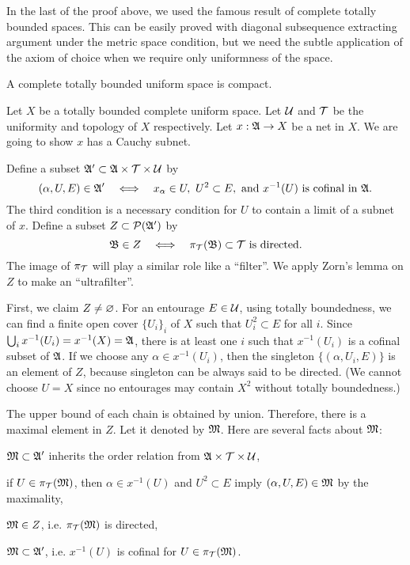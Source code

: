 \documentclass{../exp}
\begin{document}
In the last of the proof above, we used the famous result of complete totally bounded spaces.
This can be easily proved with diagonal subsequence extracting argument under the metric space condition, but we need the subtle application of the axiom of choice when we require only uniformness of the space.

\begin{thm}
A complete totally bounded uniform space is compact.
\end{thm}
\begin{pf}[1]
Let $X$ be a totally bounded complete uniform space.
Let $\mathcal{U}$ and $\mathcal{T}$ be the uniformity and topology of $X$ respectively.
Let $x:\fA\to X$ be a net in $X$.
We are going to show $x$ has a Cauchy subnet.


Define a subset $\mathfrak{A}'\subset\mathfrak{A}\times\mathcal{T}\times\mathcal{U}$ by
\[(\alpha,U,E)\in\fA'\iff x_\alpha\in U,\ U^2\subset E,\text{ and }x^{-1}(U)\text{ is cofinal in }\fA.\]
The third condition is a necessary condition for $U$ to contain a limit of a subnet of $x$.
Define a subset $Z\subset\mathcal{P}(\mathfrak{A}')$ by
\[\fB\in Z\iff \pi_\cT(\fB)\subset\cT\text{ is directed}.\]
The image of $\pi_{\mathcal{T}}$ will play a similar role like a ``filter''.
We apply Zorn's lemma on $Z$ to make an ``ultrafilter''.

First, we claim $Z\ne\varnothing$.
For an entourage $E\in\mathcal{U}$, using totally boundedness, we can find a finite open cover $\{U_i\}_i$ of $X$ such that $U_i^2\subset E$ for all $i$.
Since $\bigcup_ix^{-1}(U_i)=x^{-1}(X)=\mathfrak{A}$, there is at least one $i$ such that $x^{-1}(U_i)$ is a cofinal subset of $\mathfrak{A}$.
If we choose any $\alpha\in x^{-1}(U_i)$, then the singleton $\{(\alpha,U_i,E)\}$ is an element of $Z$, because singleton can be always said to be directed.
(We cannot choose $U=X$ since no entourages may contain $X^2$ without totally boundedness.)

The upper bound of each chain is obtained by union.
Therefore, there is a maximal element in $Z$.
Let it denoted by $\mathfrak{M}$.
Here are several facts about $\mathfrak{M}$:
\begin{cond}
\item $\mathfrak{M}\subset\mathfrak{A}'$ inherits the order relation from $\mathfrak{A}\times\mathcal{T}\times\mathcal{U}$,
\item if $U\in\pi_{\mathcal{T}}(\mathfrak{M})$, then $\alpha\in x^{-1}(U)$ and $U^2\subset E$ imply $(\alpha,U,E)\in\mathfrak{M}$ by the maximality,
\item $\mathfrak{M}\in Z$, i.e. $\pi_{\mathcal{T}}(\mathfrak{M})$ is directed,
\item $\mathfrak{M}\subset\mathfrak{A}'$, i.e. $x^{-1}(U)$ is cofinal for $U\in\pi_{\mathcal{T}}(\mathfrak{M})$.
\end{cond}


\end{pf}
\end{document}
